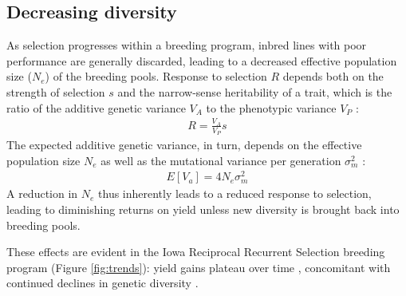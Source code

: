 \documentclass[12pt]{article}
\begin{document}
\subsection*{Decreasing diversity} 

As selection progresses within a breeding program, inbred lines with poor performance are generally discarded, leading to a decreased effective population size ($N_e$) of the breeding pools.
Response to selection $R$ depends both on the strength of selection $s$ and the narrow-sense heritability of a trait, which is the ratio of the additive genetic variance $V_A$ to the phenotypic variance $V_P$ \citep{kelly2011breeder}:
\begin{align*}
R=\frac{V_A}{V_P}s
\end{align*}
The expected additive genetic variance, in turn, depends on the effective population size $N_e$ as well as the mutational variance per generation ${\sigma}_m^2$ \citep{whitlock1999neutral}:
\begin{align*}
E[V_a] = 4N_e {\sigma}_m^2
\end{align*}
A reduction in $N_e$ thus inherently leads to a reduced response to  selection, leading to diminishing returns on yield unless new diversity is brought back into breeding pools.

These effects are evident in the Iowa Reciprocal Recurrent Selection breeding program (Figure \ref{fig:trends}): yield gains plateau over time \citep{rouse2003selection}, concomitant with continued declines in genetic diversity \citep{Gerke:2013tw}.


\end{document}
